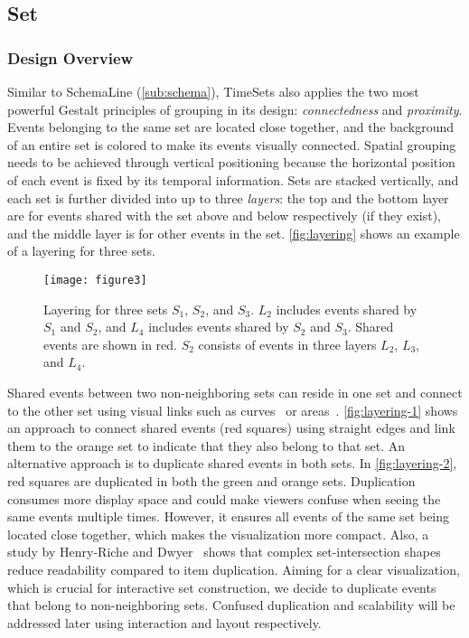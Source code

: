 \subsection{Set}
\subsubsection{Design Overview}
Similar to SchemaLine (\autoref{sub:schema}), TimeSets also applies the two most powerful Gestalt principles of grouping in its design: \emph{connectedness} and \emph{proximity}. Events belonging to the same set are located close together, and the background of an entire set is colored to make its events visually connected. Spatial grouping needs to be achieved through vertical positioning because the horizontal position of each event is fixed by its temporal information. Sets are stacked vertically, and each set is further divided into up to three \emph{layers}: the top and the bottom layer are for events shared with the set above and below respectively (if they exist), and the middle layer is for other events in the set. \autoref{fig:layering} shows an example of a layering for three sets.

\begin{figure}[!htb]
\centering
\texttt{[image: figure3]}
\caption[Layering for three sets]{Layering for three sets $S_1$, $S_2$, and $S_3$. $L_2$ includes events shared by $S_1$ and $S_2$, and $L_4$ includes events shared by $S_2$ and $S_3$. Shared events are shown in red. $S_2$ consists of events in three layers $L_2$, $L_3$, and $L_4$.}
\label{fig:layering}
\end{figure}

Shared events between two non-neighboring sets can reside in one set and connect to the other set using visual links such as curves~\cite{Alper2011} or areas~\cite{Meulemans2013}. \autoref{fig:layering-1} shows an approach to connect shared events (red squares) using straight edges and link them to the orange set to indicate that they also belong to that set. An alternative approach is to duplicate shared events in both sets. In \autoref{fig:layering-2}, red squares are duplicated in both the green and orange sets. Duplication consumes more display space and could make viewers confuse when seeing the same events multiple times. However, it ensures all events of the same set being located close together, which makes the visualization more compact. Also, a study by Henry-Riche and Dwyer~\cite{Riche2010} shows that complex set-intersection shapes reduce readability compared to item duplication. Aiming for a clear visualization, which is crucial for interactive set construction, we decide to duplicate events that belong to non-neighboring sets. Confused duplication and scalability will be addressed later using interaction and layout respectively.

